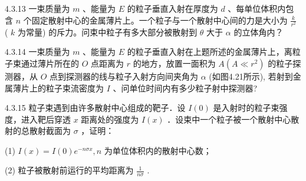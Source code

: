 \begin{problem}{4.3.13}
一束质量为 $m$ 、能量为 $E$ 的粒子垂直入射在厚度为 $d$ 、每单位体积内包含 $n$ 个固定散射中心的金属薄片上。一个粒子与一个散射中心间的力是大小为 $\frac{k}{r^2}$ ( $k$ 为常量) 的斥力。问束中粒子有多大部分被散射到 $\theta$ 大于 $\alpha$ 的立体角内？
\end{problem}
\clearpage


\begin{problem}{4.3.14}
一束质量为 $m$ 、能量为 $E$ 的粒子垂直入射在上题所述的金属薄片上，离粒子束通过薄片所在的 $O$ 点距离为 $r$ 的地方，放置一面积为 $A(A \ll r^2)$ 的粒子探测器，从 $O$ 点到探测器的线与粒子入射方向间夹角为 $\alpha$ (如图4.21所示), 若射到金属薄片上的粒子束流密度为 $I$ 、问单位时间内有多少粒子射中探测器?
\begin{center}

\end{center}
\end{problem}
\clearpage


\begin{problem}{4.3.15}
粒子束遇到由许多散射中心组成的靶子．设 $I(0)$ 是入射时的粒子束强度，进入靶后穿透 $x$ 距离处的强度为 $I(x)$ ．设束中一个粒子被一个散射中心散射的总散射截面为 $\sigma$ ，证明：

(1) $I(x)=I(0)e^{-n\sigma x},n$ 为单位体积内的散射中心数；

(2) 粒子被散射前运行的平均距离为 $\frac{1}{n\sigma}$ .
\end{problem}
\clearpage

